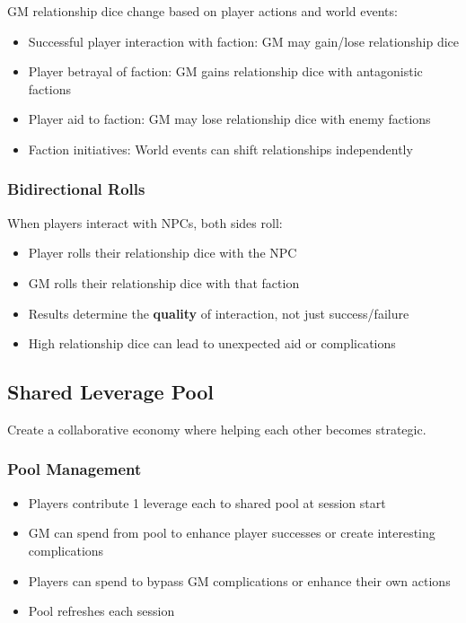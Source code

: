 GM relationship dice change based on player actions and world events:
\begin{itemize}
\item Successful player interaction with faction: GM may gain/lose relationship dice
\item Player betrayal of faction: GM gains relationship dice with antagonistic factions
\item Player aid to faction: GM may lose relationship dice with enemy factions
\item Faction initiatives: World events can shift relationships independently
\end{itemize}

\subsubsection{Bidirectional Rolls}

When players interact with NPCs, both sides roll:
\begin{itemize}
\item Player rolls their relationship dice with the NPC
\item GM rolls their relationship dice with that faction
\item Results determine the \textbf{quality} of interaction, not just success/failure
\item High relationship dice can lead to unexpected aid or complications
\end{itemize}

\subsection{Shared Leverage Pool}

Create a collaborative economy where helping each other becomes strategic.

\subsubsection{Pool Management}

\begin{itemize}
\item Players contribute 1 leverage each to shared pool at session start
\item GM can spend from pool to enhance player successes or create interesting complications
\item Players can spend to bypass GM complications or enhance their own actions
\item Pool refreshes each session
\end{itemize}

